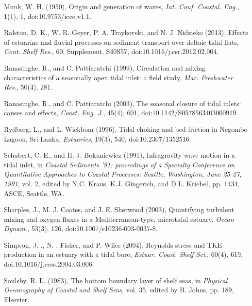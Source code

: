 \begin{thebibliography}{\textit{Ranasinghe and Patttiaratchi}(2003)}
Munk, W. H. (1950), Origin
and generation of waves, \emph{Int. Conf. Coastal. Eng.}, 1(1), 1,
doi:10.9753/icce.v1.1. 

Ralston,
D. K., W. R. Geyer, P. A. Traykovski, and N. J. Nidzieko (2013), Effects
of estuarine and fluvial processes on sediment transport over deltaic
tidal flats, \emph{Cont. Shelf Res}., 60, Supplement, S40\textendash S57,
doi:10.1016/j.csr.2012.02.004. 

Ranasinghe,
R., and C. Pattiaratchi (1999), Circulation and mixing characteristics
of a seasonally open tidal inlet: a field study, \emph{Mar. Freshwater
Res.}, 50(4), 281.

Ranasinghe,
R., and C. Pattiaratchi (2003), The seasonal closure of tidal inlets:
causes and effects, \emph{Coast. Eng. J.}, 45(4), 601,
doi:10.1142/S0578563403000919. 

Rydberg,
L., and L. Wickbom (1996), Tidal choking and bed friction in Negombo
Lagoon, Sri Lanka, \emph{Estuaries}, 19(3), 540, doi:10.2307/1352516. 

Schubert,
C. E., and H. J. Bokuniewicz (1991), Infragravity wave motion in a
tidal inlet, in \emph{Coastal Sediments \textquoteright 91: proceedings
of a Specialty Conference on Quantitative Approaches to Coastal Processes:
Seattle, Washington, June 25-27, 1991}, vol. 2, edited by N.C. Kraus,
K.J. Gingerich, and D.L. Kriebel, pp. 1434, ASCE,
Seattle, WA. 

Sharples,
J., M. J. Coates, and J. E. Sherwood (2003), Quantifying turbulent
mixing and oxygen fluxes in a Mediterranean-type, microtidal estuary,
\emph{Ocean Dynam.}, 53(3), 126, doi:10.1007/s10236-003-0037-8. 

Simpson,
J. ., N. . Fisher, and P. Wiles (2004), Reynolds stress and TKE production
in an estuary with a tidal bore, \emph{Estuar. Coast. Shelf Sci}.,
60(4), 619, doi:10.1016/j.ecss.2004.03.006. 

Soulsby, R. L. (1983),
The bottom boundary layer of shelf seas, in \emph{Physical Oceanography
of Coastal and Shelf Seas, }vol. 35, edited by B. Johns, pp. 189,
Elsevier. 


\end{thebibliography}
